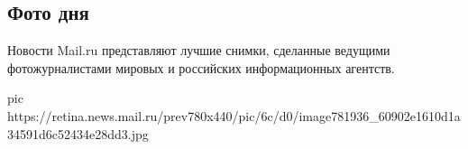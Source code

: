  
 
 
 
 
 
\subsection{Фото дня}
\label{sec:09_12_2020.news.ru.mail_ru.1.foto_dnja}

Новости Mail.ru представляют лучшие снимки, сделанные ведущими фотожурналистами
мировых и российских информационных агентств.

\ifcmt
pic https://retina.news.mail.ru/prev780x440/pic/6c/d0/image781936_60902e1610d1a34591d6c52434e28dd3.jpg
\fi
